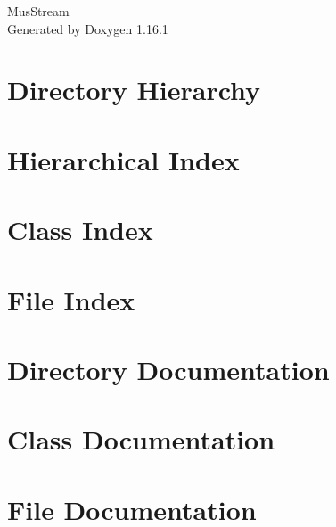 \documentclass[twoside]{book}
\newcommand{\+}{\discretionary{\mbox{\scriptsize$\hookleftarrow$}}{}{}}
\newcommand{\clearemptydoublepage}{%
    \newpage{\pagestyle{empty}\cleardoublepage}%
  }
\begin{document}
  \raggedbottom
    \hypersetup{pageanchor=false,
                bookmarksnumbered=true,
                pdfencoding=unicode
               }
  \begin{titlepage}
  \vspace*{7cm}
  \begin{center}%
  {\Large Mus\+Stream}\\
  \vspace*{1cm}
  {\large Generated by Doxygen 1.16.1}\\
  \end{center}
  \end{titlepage}
  \clearemptydoublepage
  \tableofcontents
  \clearemptydoublepage
  \hypersetup{pageanchor=true}
\chapter{Directory Hierarchy}

\chapter{Hierarchical Index}

\chapter{Class Index}

\chapter{File Index}

\chapter{Directory Documentation}


\chapter{Class Documentation}



\chapter{File Documentation}














  \backmatter
  \newpage
  \clearemptydoublepage
  \printindex
\end{document}
